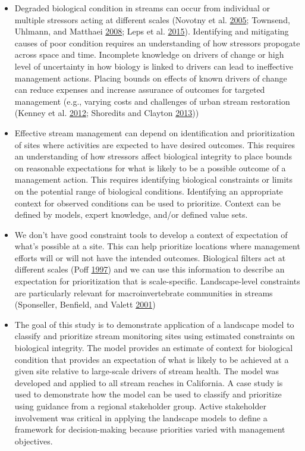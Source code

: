 \documentclass[]{article}
\begin{document}
\begin{itemize}
\item
  Degraded biological condition in streams can occur from individual or
  multiple stressors acting at different scales (Novotny et al.
  \protect\hyperlink{ref-Novotny05}{2005}; Townsend, Uhlmann, and
  Matthaei \protect\hyperlink{ref-Townsend08}{2008}; Leps et al.
  \protect\hyperlink{ref-Leps15}{2015}). Identifying and mitigating
  causes of poor condition requires an understanding of how stressors
  propogate across space and time. Incomplete knowledge on drivers of
  change or high level of uncertainty in how biology is linked to
  drivers can lead to ineffective management actions. Placing bounds on
  effects of known drivers of change can reduce expenses and increase
  assurance of outcomes for targeted management (e.g., varying costs and
  challenges of urban stream restoration (Kenney et al.
  \protect\hyperlink{ref-Kenney12}{2012}; Shoredits and Clayton
  \protect\hyperlink{ref-Shoredits13}{2013}))
\item
  Effective stream management can depend on identification and
  prioritization of sites where activities are expected to have desired
  outcomes. This requires an understanding of how stressors affect
  biological integrity to place bounds on reasonable expectations for
  what is likely to be a possible outcome of a management action. This
  requires identifying biological constraints or limits on the potential
  range of biological conditions. Identifying an appropriate context for
  observed conditions can be used to prioritize. Context can be defined
  by models, expert knowledge, and/or defined value sets.
\item
  We don't have good constraint tools to develop a context of
  expectation of what's possible at a site. This can help prioritize
  locations where management efforts will or will not have the intended
  outcomes. Biological filters act at different scales (Poff
  \protect\hyperlink{ref-Poff97}{1997}) and we can use this information
  to describe an expectation for prioritization that is scale-specific.
  Landscape-level constraints are particularly relevant for
  macroinvertebrate communities in streams (Sponseller, Benfield, and
  Valett \protect\hyperlink{ref-Sponseller01}{2001})
\item
  The goal of this study is to demonstrate application of a landscape
  model to classify and prioritize stream monitoring sites using
  estimated constraints on biological integrity. The model provides an
  estimate of context for biological condition that provides an
  expectation of what is likely to be achieved at a given site relative
  to large-scale drivers of stream health. The model was developed and
  applied to all stream reaches in California. A case study is used to
  demonstrate how the model can be used to classify and prioritize using
  guidance from a regional stakeholder group. Active stakeholder
  involvement was critical in applying the landscape models to define a
  framework for decision-making because priorities varied with
  management objectives.
\end{itemize}
\end{document}
